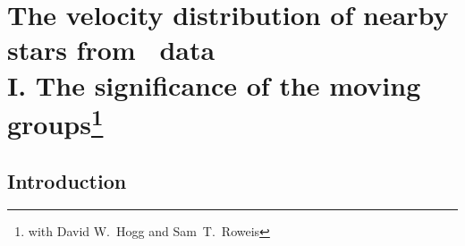 
\chapter[The velocity distribution of nearby stars from \Hipparcos\ data I. The significance of the moving groups]{The velocity distribution of nearby stars from \Hipparcos\ data\\
I. The significance of the moving groups\protect\footnote{with David W.~Hogg and Sam~T.~Roweis}}



\section{Introduction}

